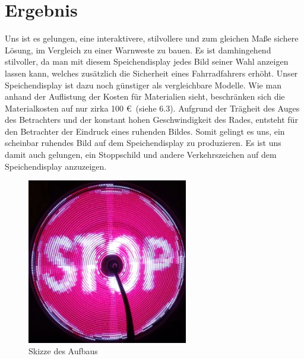 \documentclass [a4paper, 11pt] {article}
\begin{document}
\section{Ergebnis}
Uns ist es gelungen, eine interaktivere, stilvollere und zum gleichen Maße sichere Lösung, im Vergleich zu einer Warnweste zu bauen. Es ist damhingehend stilvoller, da man mit diesem Speichendisplay jedes Bild seiner Wahl anzeigen lassen kann, welches zusätzlich die Sicherheit eines Fahrradfahrers erhöht.
Unser Speichendisplay ist dazu noch günstiger als vergleichbare Modelle. Wie man anhand der Auflistung der Kosten für Materialien sieht, beschränken sich die Materialkosten auf nur zirka 100 \euro\ (siehe 6.3). Aufgrund der Trägheit des Auges des Betrachters und der konstant hohen Geschwindigkeit des Rades, entsteht für den Betrachter der Eindruck eines ruhenden Bildes. Somit gelingt es uns, ein scheinbar ruhendes Bild auf dem Speichendisplay zu produzieren. Es ist uns damit auch gelungen, ein Stoppschild und andere Verkehrszeichen auf dem Speichendisplay anzuzeigen.
\begin{figure}[h]
	\centering
	\includegraphics[width=7cm]{Stopschild.png}
	\caption{Skizze des Aufbaus}
\end{figure}
\end{document}

